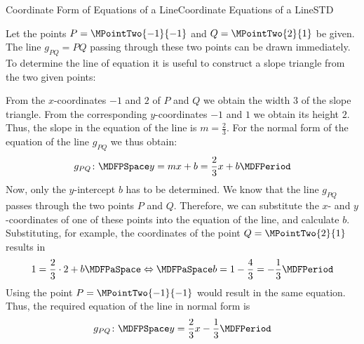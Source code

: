 \begin{MXContent}{Coordinate Form of Equations of a Line}{Coordinate Equations of a Line}{STD}
\begin{MExample}
Let the points $P=\MPointTwo{-1}{-1}$ and $Q=\MPointTwo{2}{1}$ be given. The line $g_{P Q}=P Q$ passing through these two points can be 
drawn immediately. To determine the line of equation it is useful to construct a slope triangle from the two given points:
  \begin{center}
\end{center} 

From the $x$-coordinates $-1$ and $2$ of $P$ and $Q$ we obtain the width $3$ of the slope triangle. From the corresponding $y$-coordinates 
$-1$ and $1$ we obtain its height $2$. Thus, the slope in the equation of the line is $m=\frac{2}{3}$. For the normal form of the equation of 
the line $g_{P Q}$ we thus obtain:
\[
 g_{P Q}\colon\MDFPSpace y=m x+b=\frac{2}{3}x+b\MDFPeriod
\]
Now, only the $y$-intercept $b$ has to be determined. We know that the line $g_{P Q}$ passes through the two points $P$ and $Q$. Therefore, we can 
substitute the $x$- and $y$-coordinates of one of these points into the equation of the line, and calculate $b$. Substituting, for example, 
the coordinates of the point $Q=\MPointTwo{2}{1}$ results in
\[
 1=\frac{2}{3}\cdot 2 + b\MDFPaSpace\Leftrightarrow\MDFPaSpace b=1-\frac{4}{3}=-\frac{1}{3}\MDFPeriod
\]
Using the point $P=\MPointTwo{-1}{-1}$ would result in the same equation. Thus, the required equation of the line in normal form is
\[
 g_{P Q}\colon\MDFPSpace y=\frac{2}{3}x-\frac{1}{3}\MDFPeriod
\]
\end{MExample}


\end{MXContent}
